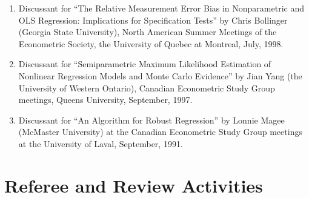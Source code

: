 \documentclass[
]{article}
\begin{document}
\begin{enumerate}
  Meetings of the Econometric Society, Singapore, July 3, 1999.
\item
  Discussant for ``The Relative Measurement Error Bias in Nonparametric
  and OLS Regression: Implications for Specification Tests'' by Chris
  Bollinger (Georgia State University), North American Summer Meetings
  of the Econometric Society, the University of Quebec at Montreal,
  July, 1998.
\item
  Discussant for ``Semiparametric Maximum Likelihood Estimation of
  Nonlinear Regression Models and Monte Carlo Evidence'' by Jian Yang
  (the University of Western Ontario), Canadian Econometric Study Group
  meetings, Queens University, September, 1997.
\item
  Discussant for ``An Algorithm for Robust Regression'' by Lonnie Magee
  (McMaster University) at the Canadian Econometric Study Group meetings
  at the University of Laval, September, 1991.
\end{enumerate}

\section*{Referee and Review
Activities}\label{referee-and-review-activities}
\end{document}
